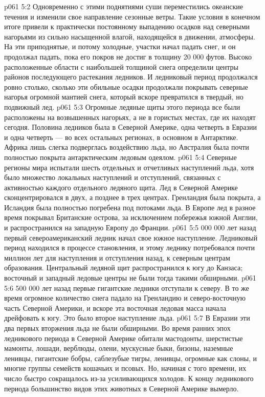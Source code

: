 \vs p061 5:2 Одновременно с этими поднятиями суши переместились океанские течения и изменили свое направление сезонные ветры. Такие условия в конечном итоге привели к практически постоянному выпадению осадков над северными нагорьями из сильно насыщенной влагой, находящейся в движении, атмосферы. На эти приподнятые, и потому холодные, участки начал падать снег, и он продолжал падать, пока его покров не достиг в толщину 20 000 футов. Высоко расположенные области с наибольшей толщиной снега определили центры районов последующего растекания ледников. И ледниковый период продолжался ровно столько, сколько эти обильные осадки продолжали покрывать северные нагорья огромной мантией снега, который вскоре превратился в твердый, но подвижный лед.
\vs p061 5:3 Огромные ледяные щиты этого периода все были расположены на возвышенных нагорьях, а не в гористых местах, где их находят сегодня. Половина ледников была в Северной Америке, одна четверть в Евразии и одна четверть --- во всех остальных регионах, в основном в Антарктике. Африка лишь слегка подверглась воздействию льда, но Австралия была почти полностью покрыта антарктическим ледовым одеялом.
\vs p061 5:4 Северные регионы мира испытали шесть отдельных и отчетливых наступлений льда, хотя было множество локальных наступлений и отступлений, связанных с активностью каждого отдельного ледяного щита. Лед в Северной Америке сконцентрировался в двух, а позднее в трех центрах. Гренландия была покрыта, а Исландия была полностью погребена под потоками льда. В Европе лед в разное время покрывал Британские острова, за исключением побережья южной Англии, и распространился на западную Европу до Франции.
\vs p061 5:5  000 000 лет назад первый североамериканский ледник начал свое южное наступление. Ледниковый период находился в процессе становления, и этому леднику потребовался почти миллион лет для наступления и отступления назад, к северным центрам образования. Центральный ледяной щит распространился к югу до Канзаса; восточный и западный ледовые центры не были тогда такими обширными.
\vs p061 5:6  500 000 лет назад первые гигантские ледники отступали к северу. В то же время огромное количество снега падало на Гренландию и северо\hyp{}восточную часть Северной Америки, и вскоре эта восточная ледовая масса начала дрейфовать к югу. Это было второе наступление льда.
\vs p061 5:7 В Евразии эти два первых вторжения льда не были обширными. Во время ранних эпох ледникового периода в Северной Америке обитали мастодонты, шерстистые мамонты, лошади, верблюды, олени, мускусные быки, бизоны, наземные ленивцы, гигантские бобры, саблезубые тигры, ленивцы, огромные как слоны, и многие группы семейств кошачьих и псовых. Но, начиная с того времени, их число быстро сокращалось из\hyp{}за усиливающихся холодов. К концу ледникового периода большинство видов этих животных в Северной Америке вымерло.
